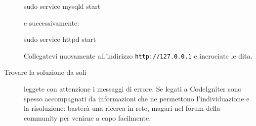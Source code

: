 \begin{description}
\begin{code}
sudo service mysqld start
\end{code}

e successivamente:

\begin{code}
sudo service httpd start
\end{code}

Collegatevi nuovamente all'indirizzo \verb|http://127.0.0.1| e incrociate le dita.
\item[Trovare la soluzione da soli] leggete con attenzione i messaggi di errore. Se legati a CodeIgniter sono spesso accompagnati da informazioni che ne permettono l'individuazione e la risoluzione: basterà una ricerca in rete, magari nel forum della community per venirne a capo facilmente.
\end{description}